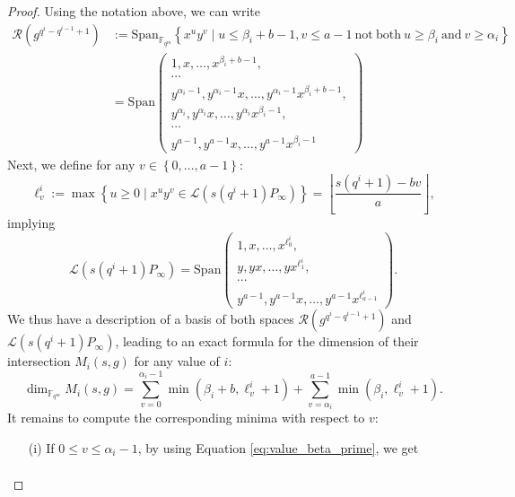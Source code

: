 \documentclass[lettersize,journal]{IEEEtran}
\theoremstyle{plain}
\theoremstyle{definition}
\theoremstyle{remark}
\newcommand{\calL}{\mathcal{L}}
\newcommand{\calR}{\mathcal{R}}
\newcommand{\fqm}{\mathbb{F}_{q^m}}
\newcommand{\set}[1]{\left\{#1\right\}}
\begin{document}
	\begin{proof}
		Using the notation above, we can write
		\begin{align*}
			\calR\left(g^{q^i-q^{i-1}+1}\right) &:= \mathrm{Span}_{\fqm} \left\{x^uy^v \mid u \leq \beta_i+b-1 , v \leq a-1 \ \mathrm{not \ both} \ u \geq \beta_i \ \mathrm{and} \ v \geq \alpha_i\right\} \\
			&= \mathrm{Span}    \left( \begin{array}{c}
				1,x,\dots,x^{\beta_i +b-1},   \\
				\cdots \\
				y^{\alpha_i -1},y^{\alpha_i -1}x,\dots,y^{\alpha_i -1}x^{\beta_i +b-1}, \\
				y^{\alpha_i},y^{\alpha_i}x,\dots,y^{\alpha_i}x^{\beta_i-1}, \\
				\cdots \\
				y^{a-1},y^{a-1}x,\dots,y^{a-1}x^{\beta_i-1}
			\end{array}
			\right)
		\end{align*}
		Next, we define for any $v \in \set{0,\dots,a-1}$:
		$$\ell^i_v := \max \set{u \geq 0 \mid x^uy^v \in \calL(s(q^i+1)P_\infty)} = \left\lfloor \dfrac{s(q^i+1)-bv}{a}\right\rfloor,$$
		implying
		\begin{equation*}
			\calL(s(q^i+1)P_\infty) = \mathrm{Span}    \left( \begin{array}{c}
				1,x,\dots,x^{\ell^i_0},   \\
				y,yx,\dots,yx^{\ell^i_1}, \\
				\cdots \\
				y^{a-1},y^{a-1}x,\dots,y^{a-1}x^{\ell^i_{a-1}}
			\end{array}
			\right).
		\end{equation*}
		We thus have a description of a basis of both spaces $\calR(g^{q^i-q^{i-1}+1})$ and $\calL(s(q^i+1)P_\infty)$, leading to an exact formula for the dimension of their intersection $M_i(s,g)$ for any value of $i$:
		\begin{equation} \label{eq:exact_dimension_M_i}
			\dim_{\fqm} M_i(s,g) = \sum\limits_{v=0}^{\alpha_i-1} \min(\beta_i+b,\ell_v^i+1) + \sum\limits_{v=\alpha_i}^{a-1} \min(\beta_i,\ell_v^i+1).
		\end{equation}
		It remains to compute the corresponding minima with respect to $v$:
		\begin{itemize}
			\item[(i)] If $0 \leq v \leq \alpha_i-1$, by using Equation \eqref{eq:value_beta_prime}, we get
			\begin{align*}

\end{align*}
\end{itemize}
\end{proof}
\end{document}
